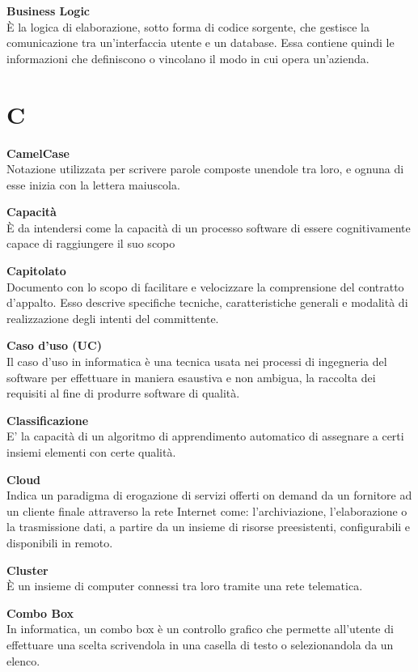 \documentclass[a4paper, oneside, openany, dvipsnames, table, 12pt]{article}
\begin{document}
\textbf{Business Logic} \\
È la logica di elaborazione, sotto forma di codice sorgente, che gestisce la comunicazione tra un'interfaccia utente e un database.
Essa contiene quindi le informazioni che definiscono o vincolano il modo in cui opera un'azienda.



\newpage
\section{C}
\textbf{CamelCase} \\
Notazione utilizzata per scrivere parole composte unendole tra loro, e ognuna di esse inizia con la lettera maiuscola.

\textbf{Capacità} \\
È da intendersi come la capacità di un processo software di essere cognitivamente capace di raggiungere il suo scopo

\textbf{Capitolato}\\	
Documento con lo scopo di facilitare e velocizzare la comprensione del contratto d'appalto. Esso descrive specifiche tecniche, caratteristiche generali e modalità di realizzazione degli intenti del committente.

\textbf{Caso d'uso (UC)} \\
Il caso d'uso in informatica è una tecnica usata nei processi di ingegneria del software per effettuare in maniera esaustiva e non ambigua, la raccolta dei requisiti al fine di produrre software di qualità.

\textbf{Classificazione} \\
 E’ la capacità di un algoritmo di apprendimento automatico di assegnare a certi insiemi elementi con certe qualità.

\textbf{Cloud} \\
Indica un paradigma di erogazione di servizi offerti on demand da un fornitore ad un cliente finale attraverso la rete Internet come: l'archiviazione, l'elaborazione o la trasmissione dati, a partire da un insieme di risorse preesistenti, configurabili e disponibili in remoto.

\textbf{Cluster} \\
È un insieme di computer connessi tra loro tramite una rete telematica.

\textbf{Combo Box} \\
In informatica, un combo box è un controllo grafico che permette all'utente di effettuare una scelta scrivendola in una casella di testo o selezionandola da un elenco. 
\end{document}
